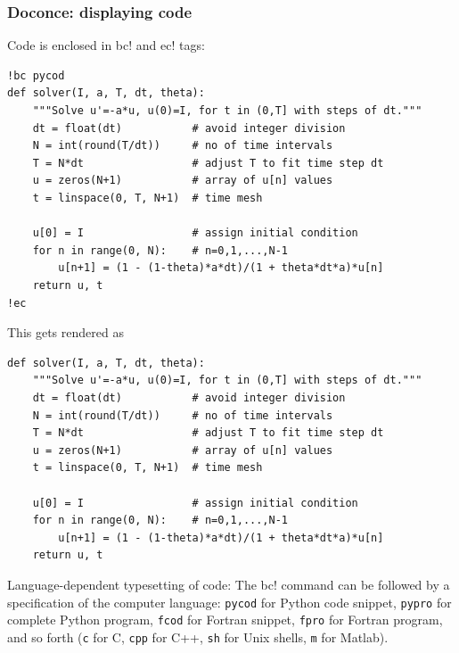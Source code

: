 \documentclass{beamer}
\newenvironment{graybox1admon}[1][]{\begin{block}{#1}}{\end{block}}
\begin{document}
\begin{frame}
\frametitle{Doconce: displaying code}

Code is enclosed in \Verb!!bc! and \Verb!!ec! tags:

\begin{Verbatim}[numbers=none,fontsize=\fontsize{9pt}{9pt},baselinestretch=0.95]
!bc pycod
def solver(I, a, T, dt, theta):
    """Solve u'=-a*u, u(0)=I, for t in (0,T] with steps of dt."""
    dt = float(dt)           # avoid integer division
    N = int(round(T/dt))     # no of time intervals
    T = N*dt                 # adjust T to fit time step dt
    u = zeros(N+1)           # array of u[n] values
    t = linspace(0, T, N+1)  # time mesh

    u[0] = I                 # assign initial condition
    for n in range(0, N):    # n=0,1,...,N-1
        u[n+1] = (1 - (1-theta)*a*dt)/(1 + theta*dt*a)*u[n]
    return u, t
!ec
\end{Verbatim}
This gets rendered as

\begin{verbatim}
def solver(I, a, T, dt, theta):
    """Solve u'=-a*u, u(0)=I, for t in (0,T] with steps of dt."""
    dt = float(dt)           # avoid integer division
    N = int(round(T/dt))     # no of time intervals
    T = N*dt                 # adjust T to fit time step dt
    u = zeros(N+1)           # array of u[n] values
    t = linspace(0, T, N+1)  # time mesh

    u[0] = I                 # assign initial condition
    for n in range(0, N):    # n=0,1,...,N-1
        u[n+1] = (1 - (1-theta)*a*dt)/(1 + theta*dt*a)*u[n]
    return u, t
\end{verbatim}


\begin{graybox1admon}[Language-dependent typesetting of code:]
The \Verb!!bc! command can be followed by a specification of the computer
language: \Verb!pycod! for Python code snippet, \Verb!pypro! for complete Python
program, \Verb!fcod! for Fortran snippet, \Verb!fpro! for Fortran program, and so
forth (\Verb!c! for C, \Verb!cpp! for C++, \Verb!sh! for Unix shells, \Verb!m! for Matlab).
\end{graybox1admon}
\end{frame}
\end{document}
